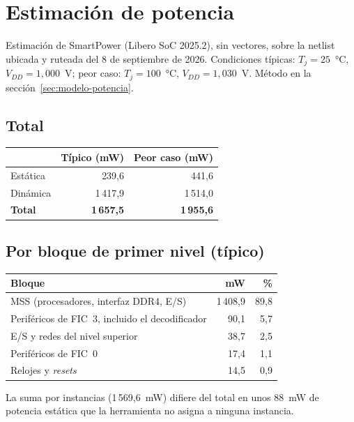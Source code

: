 \chapter{Estimación de potencia}
\label{anx:potencia}

Estimación de SmartPower (Libero SoC 2025.2), sin vectores, sobre la netlist
ubicada y ruteada del 8 de septiembre de 2026. Condiciones típicas:
$T_j = 25$~°C, $V_{DD} = 1{,}000$~V; peor caso: $T_j = 100$~°C,
$V_{DD} = 1{,}030$~V. Método en la sección~\ref{sec:modelo-potencia}.

\section*{Total}

\begin{center}\small
\begin{tabular}{@{}l r r@{}}
  \toprule
  & \textbf{Típico (mW)} & \textbf{Peor caso (mW)} \\
  \midrule
  Estática & 239,6 & 441,6 \\
  Dinámica & 1\,417,9 & 1\,514,0 \\
  \textbf{Total} & \textbf{1\,657,5} & \textbf{1\,955,6} \\
  \bottomrule
\end{tabular}
\end{center}

\section*{Por bloque de primer nivel (típico)}

\begin{center}\small
\begin{tabular}{@{}l r r@{}}
  \toprule
  \textbf{Bloque} & \textbf{mW} & \textbf{\%} \\
  \midrule
  MSS (procesadores, interfaz DDR4, E/S) & 1\,408,9 & 89,8 \\
  Periféricos de FIC~3, incluido el decodificador & 90,1 & 5,7 \\
  E/S y redes del nivel superior & 38,7 & 2,5 \\
  Periféricos de FIC~0 & 17,4 & 1,1 \\
  Relojes y \emph{resets} & 14,5 & 0,9 \\
  \bottomrule
\end{tabular}
\end{center}

La suma por instancias (1\,569,6~mW) difiere del total en unos 88~mW de
potencia estática que la herramienta no asigna a ninguna instancia.

